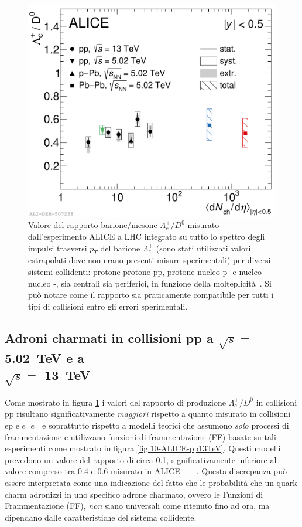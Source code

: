         \begin{figure}[t]
            \centering
            \includegraphics[width=0.65\linewidth]{res/fig/1-chapter/8-ALICE-pp13TeV-pp5.02TeV-pPb5.02TeV-PbPb5.02TeV.pdf}
            \caption{Valore del rapporto barione/mesone $\Lambda_{c}^{+}/D^{0}$ misurato dall'esperimento ALICE a LHC integrato su tutto lo spettro degli impulsi trasversi $p_{T}$ del barione $\Lambda_{c}^{+}$ (sono stati utilizzati valori estrapolati dove non erano presenti misure sperimentali) per diversi sistemi collidenti: protone-protone pp, protone-nucleo p- e nucleo-nucleo -, sia centrali sia periferici, in funzione della molteplicità~\cite{Kalteyer_ALICE_2022}. Si può notare come il rapporto sia praticamente compatibile per tutti i tipi di collisioni entro gli errori sperimentali.}
            \label{fig:8-ALICE-pp13TeV-pp5.02TeV-pPb5.02TeV-PbPb5.02TeV}
        \end{figure}

    \subsection%
    [Adroni charmati in collisioni pp a $\sqrt{s} =$ \qty{5.02}{\tera \eV} e a $\sqrt{s} =$ \qty{13}{\tera \eV}]%
    {Adroni charmati in collisioni pp a $\sqrt{s} =$ \qty{5.02}{\tera \eV} e a \\ $\sqrt{s} =$ \qty{13}{\tera \eV}}
        Come mostrato in figura \ref{fig:8-ALICE-pp13TeV-pp5.02TeV-pPb5.02TeV-PbPb5.02TeV} i valori del rapporto di produzione $\Lambda_{c}^{+}/D^{0}$ in collisioni pp risultano significativamente \textit{maggiori} rispetto a quanto misurato in collisioni ep e $e^{+} e^{-}$ e soprattutto rispetto a modelli teorici che assumono \textit{solo} processi di frammentazione e utilizzano funzioni di frammentazione (FF) basate su tali esperimenti come mostrato in figura \ref{fig:10-ALICE-pp13TeV}. Questi modelli prevedono un valore del rapporto di circa \num{0.1}, significativamente inferiore al valore compreso tra \num{0.4} e \num{0.6} misurato in ALICE~\cite{ALICE_2018_pp7Tev_pPb5.02TeV}~\cite{ALICE_2021_pp5.02TeV_pPb5.02TeV_prod}~\cite{ALICE_2021_pp5.02TeV_pPb5.02TeV_prod_ratio}~\cite{ALICE_2022_pp13TeV}. Questa discrepanza può essere interpretata come una indicazione del fatto che le probabilità che un quark charm adronizzi in uno specifico adrone charmato, ovvero le Funzioni di Frammentazione (FF), \textit{non} siano universali come ritenuto fino ad ora, ma dipendano dalle caratteristiche del sistema collidente.
        
